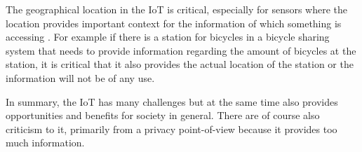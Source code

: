 The geographical location in the IoT is critical, especially for sensors where the location provides important context for the information of which something is accessing \citep{misc:locationMatters}.
For example if there is a station for bicycles in a bicycle sharing system that needs to provide information regarding the amount of bicycles at the station, it is critical that it also provides the actual location of the station or the information will not be of any use.

In summary, the IoT has many challenges but at the same time also provides opportunities and benefits for society in general.
There are of course also criticism to it, primarily from a privacy point-of-view because it provides too much information.